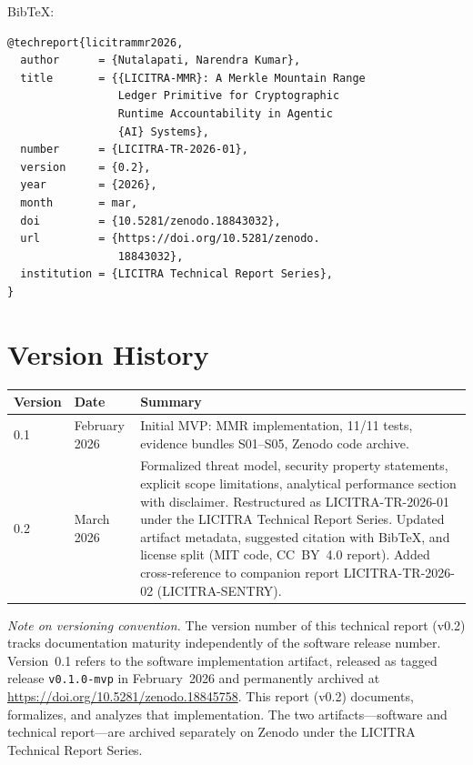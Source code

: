\documentclass{article}
\begin{document}
BibTeX:
\begin{verbatim}
@techreport{licitrammr2026,
  author      = {Nutalapati, Narendra Kumar},
  title       = {{LICITRA-MMR}: A Merkle Mountain Range
                 Ledger Primitive for Cryptographic
                 Runtime Accountability in Agentic
                 {AI} Systems},
  number      = {LICITRA-TR-2026-01},
  version     = {0.2},
  year        = {2026},
  month       = mar,
  doi         = {10.5281/zenodo.18843032},
  url         = {https://doi.org/10.5281/zenodo.
                 18843032},
  institution = {LICITRA Technical Report Series},
}
\end{verbatim}

\section*{Version History}

\begin{tabular}{@{}llp{8cm}@{}}
\toprule
\textbf{Version} & \textbf{Date} & \textbf{Summary} \\
\midrule
0.1 & February 2026 & Initial MVP: MMR implementation, 11/11 tests,
evidence bundles S01--S05, Zenodo code archive. \\
0.2 & March 2026 & Formalized threat model, security property statements,
explicit scope limitations, analytical performance section with disclaimer.
Restructured as LICITRA-TR-2026-01 under the LICITRA Technical Report Series.
Updated artifact metadata, suggested citation with BibTeX, and license split
(MIT code, CC~BY~4.0 report). Added cross-reference to companion report
LICITRA-TR-2026-02 (LICITRA-SENTRY). \\
\bottomrule
\end{tabular}

\medskip
\noindent\textit{Note on versioning convention.} The version number of this
technical report (v0.2) tracks documentation maturity independently of the
software release number. Version~0.1 refers to the software implementation
artifact, released as tagged release \texttt{v0.1.0-mvp} in February~2026 and
permanently archived at
\url{https://doi.org/10.5281/zenodo.18845758}. This report (v0.2) documents,
formalizes, and analyzes that implementation. The two artifacts---software
and technical report---are archived separately on Zenodo under the LICITRA
Technical Report Series.
\end{document}

